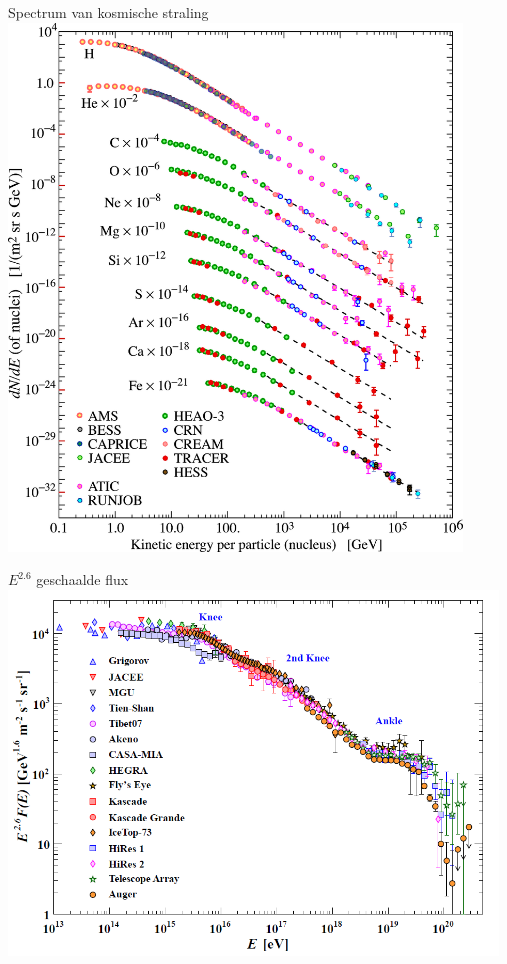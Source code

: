 \newpage

\begin{center}
{\blue Spectrum van kosmische straling}\\[5mm]
\includegraphics[keepaspectratio,height=14cm]{cr-low-e}
\end{center}

\Tr
\vspace*{1.5cm}
\begin{center}
{\blue $E^{2.6}$ geschaalde flux}\\[5mm]
\includegraphics[keepaspectratio,width=13cm]{cr-all-scaled26}
\end{center}

